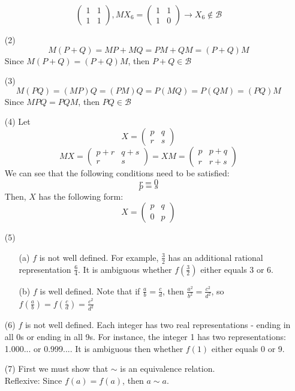\documentclass[12pt]{article}
\begin{document}
\begin{itemize}
$$\begin{pmatrix}
1 & 1 \\
1 & 1
\end{pmatrix}, MX_6 = \begin{pmatrix}
1 & 1 \\
1 & 0
\end{pmatrix} \rightarrow X_6 \not \in \mathcal{B}$$
\item[(2)]
$$M(P + Q) = MP + MQ = PM + QM = (P + Q)M$$
Since $M(P + Q) = (P + Q)M$, then $P + Q \in \mathcal{B}$
\item[(3)]
$$M(PQ) = (MP)Q = (PM)Q = P(MQ) = P(QM) = (PQ)M$$
Since $MPQ = PQM$, then $PQ \in \mathcal{B}$
\item[(4)]
Let
$$X = \begin{pmatrix}
p & q \\
r & s
\end{pmatrix}$$
$$MX = \begin{pmatrix}
p + r & q + s \\
r & s
\end{pmatrix} = XM = \begin{pmatrix}
p & p + q \\
r & r + s
\end{pmatrix}$$
We can see that the following conditions need to be satisfied:
$$r = 0$$
$$p = s$$
Then, $X$ has the following form:
$$X = \begin{pmatrix}
p & q \\
0 & p
\end{pmatrix}$$
\item[(5)]
\begin{itemize}
\item[(a)] $f$ is not well defined. For example, $\frac{3}{2}$ has an additional rational representation $\frac{6}{4}$. It is ambiguous whether $f\left(\frac{3}{2}\right)$ either equals 3 or 6.
\item[(b)] $f$ is well defined. Note that if $\frac{a}{b} = \frac{c}{d}$, then $\frac{a^2}{b^2} = \frac{c^2}{d^2}$, so $f\left(\frac{a}{b}\right) = f\left(\frac{c}{d}\right) = \frac{c^2}{d^2}$
\end{itemize}
\item[(6)] $f$ is not well defined. Each integer has two real representations - ending in all 0s or ending in all 9s. For instance, the integer 1 has two representations: 1.000... or 0.999.... It is ambiguous then whether $f(1)$ either equals 0 or 9.
\item[(7)] First we must show that $\sim$ is an equivalence relation. \\
Reflexive: Since $f(a) = f(a)$, then $a \sim a$. \\

\end{itemize}
\end{document}
